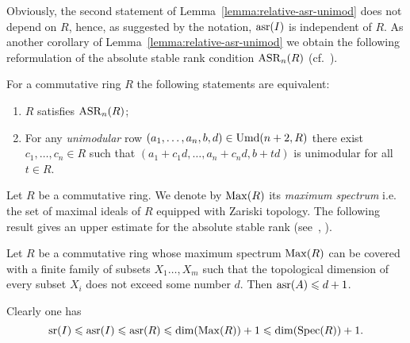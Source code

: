 Obviously, the second statement of Lemma~\ref{lemma:relative-asr-unimod} does not depend on $R$, hence, as suggested by the notation, $\operatorname{asr}(I)$ is independent of $R$.
As another corollary of Lemma~\ref{lemma:relative-asr-unimod} we obtain the following reformulation of the absolute stable rank condition $\operatorname{ASR}_n(R)$ (cf.~\cite[\S~1]{Pl98}).
\begin{cor}[A.~Bak] For a commutative ring $R$ the following statements are equivalent:
\begin{enumerate}
 \item\label{asr_Stein} $R$ satisfies $\operatorname{ASR}_n(R)$;
 \item\label{asr_Bak} For any \emph{unimodular} row $(a_1,\ldots,a_n,b,d)\in\operatorname{Umd}(n+2,R)$ there exist $c_1,\ldots,c_n\in R$ such that $(a_1+c_1d,\ldots,a_n+c_nd,b+td)$ is unimodular for all $t\in R$.
\end{enumerate}
\end{cor}

Let $R$ be a commutative ring. We denote by $\operatorname{Max}(R)$ its \emph{maximum spectrum} i.e. the set of maximal ideals of $R$ equipped with Zariski topology.
The following result gives an upper estimate for the absolute stable rank (see~\cite[Theorem~2.3]{EO}, \cite[Theorem~3.7]{MKV}).
\begin{thm}
Let $R$ be a commutative ring whose maximum spectrum $\operatorname{Max}(R)$ can be covered with a finite family of subsets 
$X_1\ldots, X_m$ such that the topological dimension of every subset $X_i$ does not exceed some number $d$. 
Then $\operatorname{asr}(A)\leqslant d+1$.
\end{thm}
Clearly one has
\[\operatorname{sr}(I)\leqslant\operatorname{asr}(I)\leqslant\operatorname{asr}(R)\leqslant \dim(\operatorname{Max}(R))+1\leqslant\dim(\operatorname{Spec}(R))+1. \]

